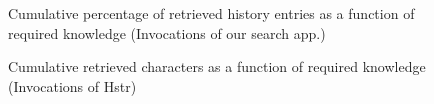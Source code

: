 \begin{figure}[h!]
\centering
{}
\caption{Cumulative percentage of retrieved history entries as a function of required knowledge (Invocations of our search app.)}
\label{eval-metrics-plot-cmds-resh}
\end{figure}


\begin{figure}[h!]
\centering
{}
\caption{Cumulative retrieved characters as a function of required knowledge (Invocations of Hstr)}
\label{eval-metrics-plot-chars-hstr}
\end{figure}

